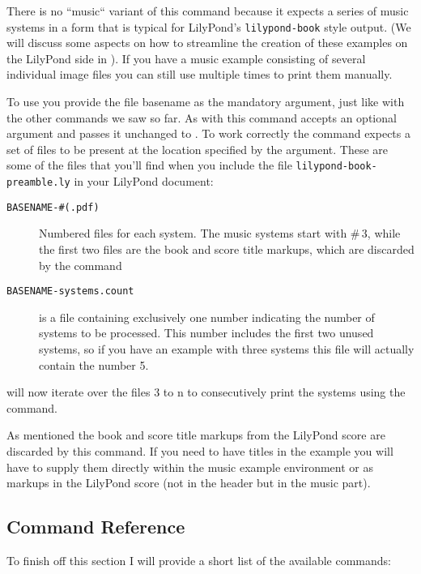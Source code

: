 \documentclass[../openLilyLib]{subfiles}
\begin{document}
There is no “music“ variant of this command because it expects a series of music systems in a form that is typical for LilyPond's \texttt{lilypond-book} style output.
(We will discuss some aspects on how to streamline the creation of these examples on the LilyPond side in ).
If you have a music example consisting of several individual image files you can still use  multiple times to print them manually.

To use  you provide the file basename as the mandatory argument, just like with the other commands we saw so far.
As with  this command accepts an optional argument and passes it unchanged to .
To work correctly the command expects a set of files to be present at the location specified by the argument.
These are some of the files that you'll find when you include the file \texttt{lilypond-book-preamble.ly} in your LilyPond document:
\begin{description}
\item[\texttt{BASENAME-\#(.pdf)}] Numbered files for each system.
The music systems start with \#\,3, while the first two files are the book and score title markups, which are discarded by the command
\item[\texttt{BASENAME-systems.count}] is a file containing exclusively one number indicating the number of systems to be processed.
This number includes the first two unused systems, so if you have an example with three systems this file will actually contain the number 5.
\end{description}

 will now iterate over the files 3 to n to consecutively print the systems using the  command.
\\

As mentioned the book and score title markups from the LilyPond score are discarded by this command.
If you need to have titles in the example you will have to supply them directly within the music example environment or as markups in the LilyPond score (not in the header but in the music part).

\subsection{Command Reference}
\label{subsec:xmp_command-reference}
To finish off this section I will provide a short list of the available commands:
\end{document}
